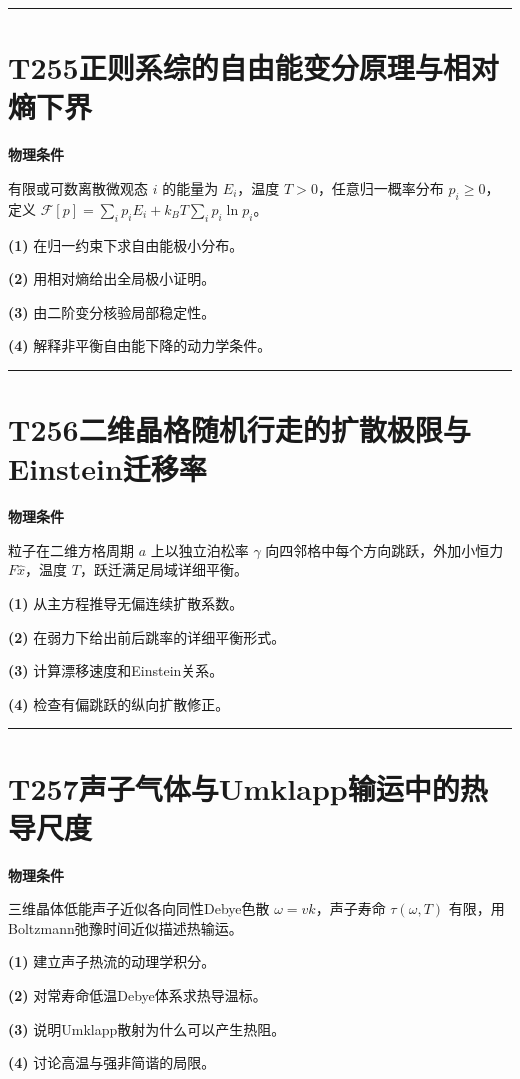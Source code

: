 \documentclass[UTF8,a4paper,11pt,oneside,openany]{ctexbook}
\begin{document}
\par\bigskip\hrule\bigskip
\section*{T255\quad 正则系综的自由能变分原理与相对熵下界}
\textbf{物理条件}\par 有限或可数离散微观态 \(i\) 的能量为 \(E_i\)，温度 \(T>0\)，任意归一概率分布 \(p_i\ge0\)，定义 \(\mathcal F[p]=\sum_i p_iE_i+k_BT\sum_i p_i\ln p_i\)。
\par\noindent\textbf{(1)} 在归一约束下求自由能极小分布。
\par\noindent\textbf{(2)} 用相对熵给出全局极小证明。
\par\noindent\textbf{(3)} 由二阶变分核验局部稳定性。
\par\noindent\textbf{(4)} 解释非平衡自由能下降的动力学条件。

\par\bigskip\hrule\bigskip
\section*{T256\quad 二维晶格随机行走的扩散极限与Einstein迁移率}
\textbf{物理条件}\par 粒子在二维方格周期 \(a\) 上以独立泊松率 \(\gamma\) 向四邻格中每个方向跳跃，外加小恒力 \(F\hat x\)，温度 \(T\)，跃迁满足局域详细平衡。
\par\noindent\textbf{(1)} 从主方程推导无偏连续扩散系数。
\par\noindent\textbf{(2)} 在弱力下给出前后跳率的详细平衡形式。
\par\noindent\textbf{(3)} 计算漂移速度和Einstein关系。
\par\noindent\textbf{(4)} 检查有偏跳跃的纵向扩散修正。

\par\bigskip\hrule\bigskip
\section*{T257\quad 声子气体与Umklapp输运中的热导尺度}
\textbf{物理条件}\par 三维晶体低能声子近似各向同性Debye色散 \(\omega=vk\)，声子寿命 \(\tau(\omega,T)\) 有限，用Boltzmann弛豫时间近似描述热输运。
\par\noindent\textbf{(1)} 建立声子热流的动理学积分。
\par\noindent\textbf{(2)} 对常寿命低温Debye体系求热导温标。
\par\noindent\textbf{(3)} 说明Umklapp散射为什么可以产生热阻。
\par\noindent\textbf{(4)} 讨论高温与强非简谐的局限。
\end{document}
